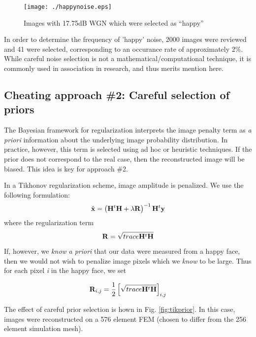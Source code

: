 \documentclass[12pt]{iopart}
\begin{document}
%
%
\begin{figure}[th]
\begin{flushright}
\texttt{[image: ./happynoise.eps]}
\caption{\small 
Images with 17.75dB WGN which were selected as ``happy''
 }
 \label{fig:happynoise}
\end{flushright}
\end{figure}

In order to determine the frequency of 'happy' noise, 2000
images were reviewed and 41 were selected, corresponding
to an occurance rate of approximately 2\%.
While careful noise selection is not a mathematical/computational
technique, it is commonly used in association in research,
and thus merits mention here.

\subsection{ Cheating approach \#2:
             Careful selection of priors}

The Bayesian framework for regularization interprets
the image penalty term as {\em a priori} information 
about the underlying image probability distribution.
In practice, however, this term is selected using
ad hoc or heuristic techniques. If the prior does
not correspond to the real case, then the reconstructed
image will be biased. This idea is key for approach \#2.

In a Tikhonov regularization scheme, image amplitude
is penalized. We use the following formulation:
\begin{equation}
   \hat{\bf x} = 
   \left({\bf H}^t{\bf H} + \lambda{\bf R}\right)^{-1}
         {\bf H}^t{\bf y}
\end{equation}
where the regularization term 
\begin{equation}
   {\bf R} = \sqrt{ trace {\bf H}^t{\bf H} }
\end{equation}

If, however, we {\em know} {\em a priori} that 
our data were measured from a happy face, then we 
would not wish to penalize image pixels which we
{\em know} to be large. Thus for each pixel {\em i}
in the happy face, we set 

\begin{equation}
   {\bf R}_{i,j} = \frac{1}{2} \left[
              \sqrt{ trace {\bf H}^t{\bf H} }
                               \right]_{i,j}
\end{equation}

The effect of careful prior selection is hown in
Fig. \ref{fig:tikprior}.
In this case, images were reconstructed on a 576 element
FEM (chosen to differ from the 256 element simulation mesh).
\end{document}
